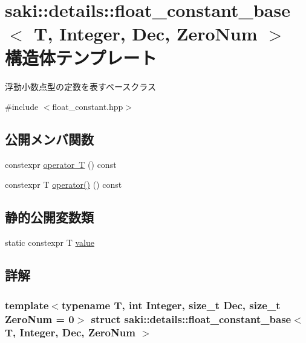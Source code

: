 \hypertarget{structsaki_1_1details_1_1float__constant__base}{}\section{saki\+:\+:details\+:\+:float\+\_\+constant\+\_\+base$<$ T, Integer, Dec, Zero\+Num $>$ 構造体テンプレート}
\label{structsaki_1_1details_1_1float__constant__base}


浮動小数点型の定数を表すベースクラス  




{\ttfamily \#include $<$float\+\_\+constant.\+hpp$>$}

\subsection*{公開メンバ関数}
\begin{DoxyCompactItemize}
\item 
constexpr \mbox{\hyperlink{structsaki_1_1details_1_1float__constant__base_a35b0e1f79344dc7f1dff6ed2b6209c7d}{operator T}} () const
\item 
constexpr T \mbox{\hyperlink{structsaki_1_1details_1_1float__constant__base_a914139c26ddf5f9664b381a51e6423d4}{operator()}} () const
\end{DoxyCompactItemize}
\subsection*{静的公開変数類}
\begin{DoxyCompactItemize}
\item 
static constexpr T \mbox{\hyperlink{structsaki_1_1details_1_1float__constant__base_a7c1fcb103a7419a7812cf095f1ffff61}{value}}
\end{DoxyCompactItemize}


\subsection{詳解}
\subsubsection*{template$<$typename T, int Integer, size\+\_\+t Dec, size\+\_\+t Zero\+Num = 0$>$\newline
struct saki\+::details\+::float\+\_\+constant\+\_\+base$<$ T, Integer, Dec, Zero\+Num $>$}

